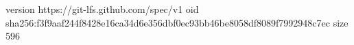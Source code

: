 version https://git-lfs.github.com/spec/v1
oid sha256:f3f9aaf244f8428e16ca34d6e356dbf0ec93bb46be8058df8089f7992948c7ec
size 596
